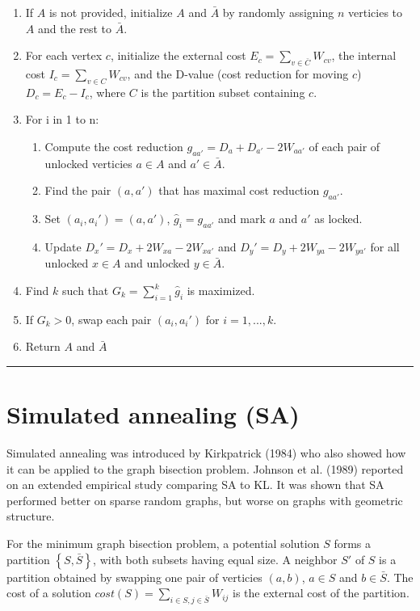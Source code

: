 \documentclass[11pt,]{article}
\begin{document}
\begin{enumerate}
\item If $A$ is not provided, initialize $A$ and $\bar{A}$ by randomly assigning $n$ verticies to $A$ and the rest to $\bar{A}$.
\item For each vertex $c$, initialize the external cost $E_c = \sum_{v\in\bar{C}} W_{cv}$, the internal cost $I_c = \sum_{v\in C} W_{cv}$, and the D-value (cost reduction for moving $c$) $D_c = E_c - I_c$, where $C$ is the partition subset containing $c$.
\item For i in 1 to n:
  \begin{enumerate}
  \item Compute the cost reduction $g_{aa'} = D_a + D_{a'} - 2W_{aa'}$ of each pair of unlocked verticies $a \in A$ and $a' \in \bar{A}$.
  \item Find the pair $(a, a')$ that has maximal cost reduction $g_{aa'}$.
  \item Set $(a_i, a_i') = (a, a')$, $\hat{g}_i = g_{aa'}$ and mark $a$ and $a'$ as locked.
  \item Update $D_x' = D_x + 2W_{xa} - 2W_{xa'}$ and $D_y' = D_y + 2W_{ya} - 2W_{ya'}$ for all unlocked $x \in A$ and unlocked $y \in \bar{A}$.
  \end{enumerate}
\item Find $k$ such that $G_k = \sum_{i=1}^k \hat{g}_i$ is maximized.
\item If $G_k > 0$, swap each pair $(a_i, a_i')$ for $i = 1, ..., k$.
\item Return $A$ and $\bar{A}$
\end{enumerate}\hrule

\section{Simulated annealing (SA)}\label{simulated-annealing-sa}

Simulated annealing was introduced by Kirkpatrick (1984) who also showed
how it can be applied to the graph bisection problem. Johnson et al.
(1989) reported on an extended empirical study comparing SA to KL. It
was shown that SA performed better on sparse random graphs, but worse on
graphs with geometric structure.

For the minimum graph bisection problem, a potential solution \(S\)
forms a partition \(\left\{S, \bar{S}\right\}\), with both subsets
having equal size. A neighbor \(S'\) of \(S\) is a partition obtained by
swapping one pair of verticies \((a, b)\), \(a\in S\) and
\(b \in \bar{S}\). The cost of a solution
\(cost(S) = \sum_{i \in S, j \in \bar{S}} W_{ij}\) is the external cost
of the partition.
\end{document}
